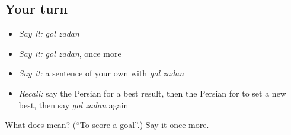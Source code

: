 \subsection*{Your turn}
\begin{itemize}
\raggedright
  \item \emph{Say it:} \emph{gol zadan}
  \item \emph{Say it:} \emph{gol zadan}, once more
  \item \emph{Say it:} a sentence of your own with \emph{gol zadan}
  \item \emph{Recall:} say the Persian for a best result, then the Persian for to set a new best, then say \emph{gol zadan} again
\end{itemize}

\begin{tcolorbox}[breakable,colback=teal!4,colframe=teal!35!black,title={Before you move on}]
What does   mean? (\textquotedblleft{}To score a goal\textquotedblright{}.) Say it once more.
\end{tcolorbox}
